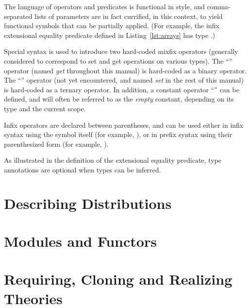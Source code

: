 The language of operators and predicates is functional in style, and
comma-separated lists of parameters are in fact currified, in this context, to
yield functional symbols that can be partially applied. (For example, the infix
extensional equality predicate \ec{(==)} defined in Listing~\ref{lst:arrays} has
type .)

Special syntax is used to introduce two hard-coded mixfix operators (generally
considered to correspond to set and get operations on various types). The
``'' operator (named \emph{get}
throughout this manual) is hard-coded as a binary operator. The
``'' operator (not yet encountered,
and named \emph{set} in the rest of this manual) is hard-coded as a ternary
operator. In addition, a constant operator ``\rawec{[]}'' can be defined, and
will often be referred to as the \emph{empty} constant, depending on its type
and the current scope.

Infix operators are declared between parentheses, and can be used either in
infix syntax using the symbol itself (for example, ), or in prefix
syntax using their parenthesized form (for example, ).

As illustrated in the definition of the extensional equality predicate, type
annotations are optional when types can be inferred.


\section{Describing Distributions\label{sec:distributions}}

\section{Modules and Functors\label{sec:modules}}

\section{Requiring, Cloning and Realizing Theories\label{sec:cloning}}

